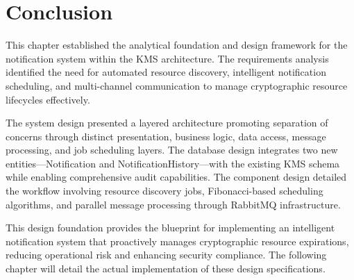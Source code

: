 \section*{Conclusion}

This chapter established the analytical foundation and design framework for the notification system within the KMS architecture. The requirements analysis identified the need for automated resource discovery, intelligent notification scheduling, and multi-channel communication to manage cryptographic resource lifecycles effectively.

\noindent
The system design presented a layered architecture promoting separation of concerns through distinct presentation, business logic, data access, message processing, and job scheduling layers. The database design integrates two new entities—Notification and NotificationHistory—with the existing KMS schema while enabling comprehensive audit capabilities. The component design detailed the workflow involving resource discovery jobs, Fibonacci-based scheduling algorithms, and parallel message processing through RabbitMQ infrastructure.

\noindent
This design foundation provides the blueprint for implementing an intelligent notification system that proactively manages cryptographic resource expirations, reducing operational risk and enhancing security compliance. The following chapter will detail the actual implementation of these design specifications.